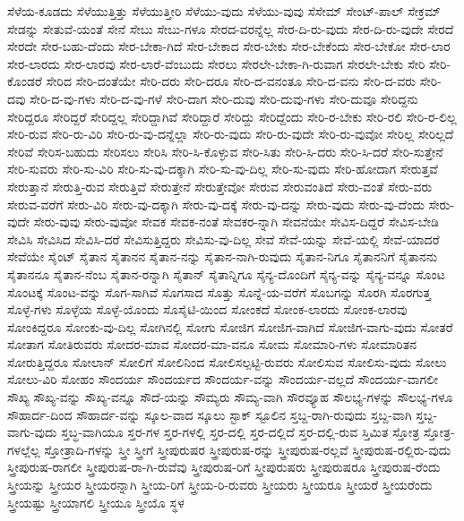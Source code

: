 {ಸೆಳೆಯ-ಕೂಡದು
ಸೆಳೆಯುತ್ತಿತ್ತು
ಸೆಳೆಯುತ್ತೀರಿ
ಸೆಳೆಯು-ವುದು
ಸೆಳೆಯು-ವುವು
ಸೆಸೇಮ್
ಸೇಂಟ್-ಪಾಲ್
ಸೇಕ್ರಮ್
ಸೇಡನ್ನು
ಸೇತುವೆ-ಯಂತೆ
ಸೇನೆ
ಸೇಬು
ಸೇಬು-ಗಳೂ
ಸೇರದ-ವರನ್ನೆಲ್ಲ
ಸೇರ-ದಿ-ರು-ವುದು
ಸೇರ-ದಿ-ರು-ವುದೇ
ಸೇರದೆ
ಸೇರದೇ
ಸೇರ-ಬಹು-ದೆಂದು
ಸೇರ-ಬೇಕಾ-ಗಿದೆ
ಸೇರ-ಬೇಕಾದ
ಸೇರ-ಬೇಕು
ಸೇರ-ಬೇಕೆಂದು
ಸೇರ-ಬೇಕೋ
ಸೇರ-ಲಾರ
ಸೇರ-ಲಾರದು
ಸೇರ-ಲಾರವು
ಸೇರ-ಲಾರೆ-ವೆಂಬುದು
ಸೇರಲು
ಸೇರಲೇ-ಬೇಕಾ-ಗಿ-ರುವಾಗ
ಸೇರಲೇ-ಬೇಕು
ಸೇರಿ
ಸೇರಿ-ಕೊಂಡರೆ
ಸೇರಿದ
ಸೇರಿ-ದಂತೆಯೇ
ಸೇರಿ-ದರು
ಸೇರಿ-ದರೂ
ಸೇರಿ-ದ-ವನಂತೂ
ಸೇರಿ-ದ-ವನು
ಸೇರಿ-ದ-ವರು
ಸೇರಿ-ದವು
ಸೇರಿ-ದ-ವು-ಗಳು
ಸೇರಿ-ದ-ವು-ಗಳೆ
ಸೇರಿ-ದಾಗ
ಸೇರಿ-ದುವು
ಸೇರಿ-ದುವು-ಗಳು
ಸೇರಿ-ದುವೂ
ಸೇರಿದ್ದನು
ಸೇರಿದ್ದರೂ
ಸೇರಿದ್ದರೆ
ಸೇರಿದ್ದಲ್ಲ
ಸೇರಿದ್ದಾಗಿವೆ
ಸೇರಿದ್ದಾರೆ
ಸೇರಿದ್ದು
ಸೇರಿದ್ದೆಂದು
ಸೇರಿ-ರ-ಬೇಕು
ಸೇರಿ-ರಲಿ
ಸೇರಿ-ರ-ಲಿಲ್ಲ
ಸೇರಿ-ರುವ
ಸೇರಿ-ರು-ವಿರಿ
ಸೇರಿ-ರು-ವು-ದನ್ನೆಲ್ಲಾ
ಸೇರಿ-ರು-ವುದು
ಸೇರಿ-ರು-ವುದೇ
ಸೇರಿ-ರು-ವುವೋ
ಸೇರಿಲ್ಲ
ಸೇರಿಲ್ಲದೆ
ಸೇರಿವೆ
ಸೇರಿಸ-ಬಹುದು
ಸೇರಿಸಲು
ಸೇರಿಸಿ
ಸೇರಿ-ಸಿ-ಕೊಳ್ಳುವ
ಸೇರಿ-ಸಿತು
ಸೇರಿ-ಸಿ-ದರು
ಸೇರಿ-ಸಿ-ದರೆ
ಸೇರಿ-ಸುತ್ತೇನೆ
ಸೇರಿ-ಸುವರು
ಸೇರಿ-ಸು-ವಿರಿ
ಸೇರಿ-ಸು-ವು-ದಕ್ಕಾಗಿ
ಸೇರಿ-ಸು-ವು-ದಿಲ್ಲ
ಸೇರಿ-ಸು-ವುದು
ಸೇರಿ-ಹೋದಾಗ
ಸೇರುತ್ತವೆ
ಸೇರುತ್ತಾನೆ
ಸೇರುತ್ತಿ-ರುವ
ಸೇರುತ್ತಿವೆ
ಸೇರುತ್ತೇನೆ
ಸೇರುತ್ತೇವೋ
ಸೇರುವ
ಸೇರುವಂತಿದೆ
ಸೇರು-ವಂತೆ
ಸೇರು-ವರು
ಸೇರುವ-ವರೆಗೆ
ಸೇರು-ವಿರಿ
ಸೇರು-ವು-ದಕ್ಕಾಗಿ
ಸೇರು-ವು-ದಕ್ಕೆ
ಸೇರು-ವು-ದನ್ನು
ಸೇರು-ವುದು
ಸೇರು-ವು-ದೆಂದು
ಸೇರು-ವುದೇ
ಸೇರು-ವುವು
ಸೇರು-ವುವೋ
ಸೇವಕ
ಸೇವಕ-ನಂತೆ
ಸೇವಕರ-ನ್ನಾಗಿ
ಸೇವನೆಯೇ
ಸೇವಿಸ-ದಿದ್ದರೆ
ಸೇವಿಸ-ಬೇಡಿ
ಸೇವಿಸಿ
ಸೇವಿಸಿದ
ಸೇವಿಸಿ-ದರೆ
ಸೇವಿಸುತ್ತಿದ್ದರು
ಸೇವಿಸು-ವು-ದಿಲ್ಲ
ಸೇವೆ
ಸೇವೆ-ಯನ್ನು
ಸೇವೆ-ಯಲ್ಲಿ
ಸೇವೆ-ಯಾದರೆ
ಸೇವೆಯೇ
ಸೈಂಟ್
ಸೈತಾನ
ಸೈತಾನನ
ಸೈತಾನ-ನನ್ನು
ಸೈತಾನ-ನಾಗಿ-ರುವುದು
ಸೈತಾನ-ನಿಗೂ
ಸೈತಾನನಿಗೆ
ಸೈತಾನನು
ಸೈತಾನನೂ
ಸೈತಾನ-ನೆಂಬ
ಸೈತಾನ-ರನ್ನಾಗಿ
ಸೈತಾನ್
ಸೈತಾನ್ನಿಗೂ
ಸೈನ್ಯ-ದೊಂದಿಗೆ
ಸೈನ್ಯ-ವನ್ನು
ಸೈನ್ಯ-ವನ್ನೂ
ಸೊಂಟ
ಸೊಂಟಕ್ಕೆ
ಸೊಂಟ-ವನ್ನು
ಸೊಗ-ಸಾಗಿವೆ
ಸೊಗಸಾದ
ಸೊತ್ತು
ಸೊನ್ನೆ-ಯ-ವರೆಗೆ
ಸೊಬಗನ್ನು
ಸೊರಗಿ
ಸೊರಗುತ್ತ
ಸೊಳ್ಳೆ-ಗಳು
ಸೊಳ್ಳೆಯ
ಸೊಳ್ಳೆ-ಯೊಂದು
ಸೊಸೈಟಿ-ಯಿಂದ
ಸೋಂಕದೆ
ಸೋಂಕ-ಲಾರದು
ಸೋಂಕ-ಲಾರವು
ಸೋಂಕಿದ್ದರೂ
ಸೋಂಕು-ವು-ದಿಲ್ಲ
ಸೋಗಿನಲ್ಲಿ
ಸೋಗು
ಸೋಜಿಗ
ಸೋಜಿಗ-ವಾಗಿದೆ
ಸೋಜಿಗ-ವಾಗು-ವುದು
ಸೋತರೆ
ಸೋತಾಗ
ಸೋತಿರುವರು
ಸೋದರ-ಮಾವ
ಸೋದರ-ಮಾ-ವನೂ
ಸೋಮ
ಸೋಮಾರಿ-ಗಳು
ಸೋಮಾರಿತನ
ಸೋರುತ್ತಿದ್ದರೂ
ಸೋಲಾನ್
ಸೋಲಿಗೆ
ಸೋಲಿನಿಂದ
ಸೋಲಿಸಲ್ಪಟ್ಟಿ-ರುವರು
ಸೋಲಿಸುವ
ಸೋಲಿಸು-ವುದು
ಸೋಲು
ಸೋಲು-ವಿರಿ
ಸೋಹಂ
ಸೌಂದರ್ಯ
ಸೌಂದರ್ಯದ
ಸೌಂದರ್ಯ-ವನ್ನು
ಸೌಂದರ್ಯ-ವಲ್ಲದೆ
ಸೌಂದರ್ಯ-ವಾಗಲೀ
ಸೌಖ್ಯ
ಸೌಖ್ಯ-ವನ್ನು
ಸೌಖ್ಯ-ವನ್ನೂ
ಸೌದೆ-ಯನ್ನು
ಸೌಮ್ಯರು
ಸೌಮ್ಯ-ವಾಗಿ
ಸೌರವ್ಯೂಹ
ಸೌಲಭ್ಯ-ಗಳನ್ನು
ಸೌಲಭ್ಯ-ಗಳೂ
ಸೌಹಾರ್ದ-ದಿಂದ
ಸೌಹಾರ್ದ-ವನ್ನು
ಸ್ಕೂಲ-ವಾದ
ಸ್ಕೂಲು
ಸ್ಟಾಕ್
ಸ್ಟೂಲಿನ
ಸ್ತಬ್ದ-ರಾಗಿ-ರುವುದು
ಸ್ತಬ್ದ-ವಾಗಿ
ಸ್ತಬ್ದ-ವಾಗು-ವುದು
ಸ್ತಬ್ಧ-ವಾಗಿಯೂ
ಸ್ತರ-ಗಳ
ಸ್ತರ-ಗಳಲ್ಲಿ
ಸ್ತರ-ದಲ್ಲಿ
ಸ್ತರ-ದಲ್ಲಿದೆ
ಸ್ತರ-ದಲ್ಲಿ-ರುವ
ಸ್ತಿಮಿತ
ಸ್ತೋತ್ರ
ಸ್ತೋತ್ರ-ಗಳಲ್ಲೆಲ್ಲ
ಸ್ತೋತ್ರಾದಿ-ಗಳನ್ನು
ಸ್ತ್ರೀ
ಸ್ತ್ರೀಗೆ
ಸ್ತ್ರೀಪುರುಷರ
ಸ್ತ್ರೀಪುರುಷ-ರನ್ನು
ಸ್ತ್ರೀಪುರುಷ-ರಲ್ಲವೆ
ಸ್ತ್ರೀಪುರುಷ-ರಲ್ಲಿರು-ವುದು
ಸ್ತ್ರೀಪುರುಷ-ರಾಗಲೀ
ಸ್ತ್ರೀಪುರುಷ-ರಾ-ಗಿ-ರುವೆವು
ಸ್ತ್ರೀಪುರುಷ-ರಿಗೆ
ಸ್ತ್ರೀಪುರುಷರು
ಸ್ತ್ರೀಪುರುಷರೂ
ಸ್ತ್ರೀಪುರುಷ-ರೆಂದು
ಸ್ತ್ರೀಯನ್ನು
ಸ್ತ್ರೀಯರ
ಸ್ತ್ರೀಯರನ್ನಾಗಿ
ಸ್ತ್ರೀಯ-ರಿಗೆ
ಸ್ತ್ರೀಯ-ರಿ-ರುವರು
ಸ್ತ್ರೀಯರು
ಸ್ತ್ರೀಯರೂ
ಸ್ತ್ರೀಯರೆ
ಸ್ತ್ರೀಯರೆಂದು
ಸ್ತ್ರೀಯಷ್ಟು
ಸ್ತ್ರೀಯಾಗಲಿ
ಸ್ತ್ರೀಯೂ
ಸ್ತ್ರೀಯೊ
ಸ್ಥಳ
}
